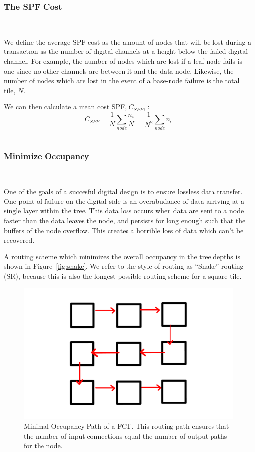 \subsubsection{The SPF Cost}~\label{sec:spf_cost}

We define the average SPF cost as the amount of nodes that will be lost during a transaction as the number of digital channels at a height below the failed digital channel.
For example, the number of nodes which are lost if a leaf-node fails is one since no other channels are between it and the data node.
Likewise, the number of nodes which are lost in the event of a base-node failure is the total tile, $N$.

We can then calculate a mean cost SPF, $C_{SPF}$, :
\begin{equation}
  C_{SPF} = \frac{1}{N}\sum_{node} \frac{n_{i}}{N} = \frac{1}{N^{2}}\sum_{node} n_{i}
\end{equation}~\label{eq:cspf}

\subsubsection{Minimize Occupancy}~\label{sec:min_conn}

One of the goals of a succesful digital design is to ensure lossless data transfer.
One point of failure on the digital side is an overabudance of data arriving at a single layer within the tree.
This data loss occurs when data are sent to a node faster than the data leaves the node, and persists for long enough such that the buffers of the node overflow.
This creates a horrible loss of data which can't be recovered.

A routing scheme which minimizes the overall occupancy in the tree depths is shown in Figure~\ref{fig:snake}.
We refer to the style of routing as ``Snake''-routing (SR), because this is also the longest possible routing scheme for a square tile.

\begin{figure}[]
\centering
\includegraphics[width=\textwidth]{images/snakeroute.pdf}
\caption{Minimal Occupancy Path of a FCT. This routing path ensures that the number of input connections equal the number of output paths for the node.}
\end{figure}~\label{fig:snake}

